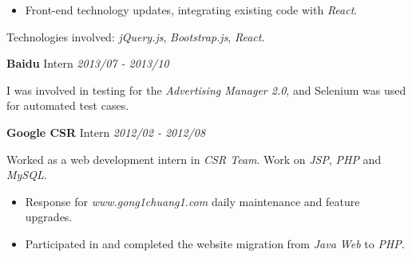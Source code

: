 \documentclass[a4paper]{article}
\newenvironment{changemargin}[2]{%
  \begin{list}{}{%
    \setlength{\topsep}{0pt}%
    \setlength{\leftmargin}{#1}%
    \setlength{\rightmargin}{#2}%
    \setlength{\listparindent}{\parindent}%
    \setlength{\itemindent}{\parindent}%
    \setlength{\parsep}{\parskip}%
  }%
  \item[]}{\end{list}
}
\newenvironment{body} {
	\vspace*{-16pt}
	\begin{changemargin}{-0.5in}{-0.5in}
  }
	{\end{changemargin}
}
\begin{document}
\begin{body}
	\vspace*{-8pt}
	\begin{itemize} \itemsep -0pt  %
		\item \begin{justify}
			Front-end technology updates, integrating existing code with \emph{React}.
		\end{justify} 
	\end{itemize}

	Technologies involved: \emph{jQuery.js}, \emph{Bootstrap.js}, \emph{React}.\\

	\medskip
	
	\textbf{Baidu} \hfill Intern \emph{2013/07 - 2013/10}\\ 

	\begin{justify}
		I was involved in testing for the \emph{Advertising Manager 2.0}, and Selenium was used for automated test cases.
	\end{justify}

	\medskip
	
	\textbf{Google CSR} \hfill Intern \emph{2012/02 - 2012/08}\\ 
	
	\begin{justify}
		Worked as a web development intern in \emph{CSR Team}. Work on \emph{JSP}, \emph{PHP} and \emph{MySQL}.
	\end{justify}
	\smallskip
	
	\vspace*{-8pt}
	\begin{itemize} \itemsep -0pt  %
		\item \begin{justify}
			Response for \emph{www.gong1chuang1.com} daily maintenance and feature upgrades.
		\end{justify}
	\end{itemize}

	\vspace*{-8pt}
	\begin{itemize} \itemsep -0pt  %
		\item \begin{justify}
			Participated in and completed the website migration from \emph{Java Web} to \emph{PHP}.
		\end{justify}
	\end{itemize}

\end{body}
\end{document}
